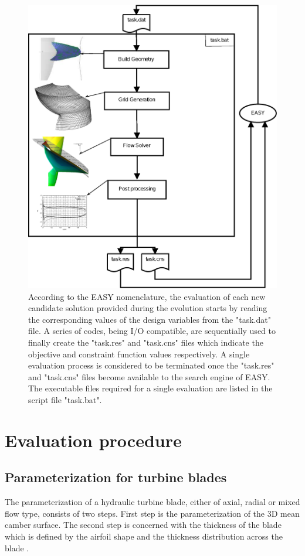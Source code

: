 \begin{figure}[h!]
\centering
\includegraphics[width=135mm]{Optimizationloop.eps} 
\caption{According to the EASY nomenclature, the evaluation of each new candidate solution provided during the evolution starts by reading the corresponding values of the design variables from the "task.dat" file. A series of codes, being I/O compatible, are sequentially used to finally create the "task.res" and "task.cns" files which indicate the objective and constraint function values respectively. A single evaluation process is considered to be terminated once the "task.res" and "task.cns" files  become available to the search engine of EASY. The executable files required for a single evaluation are listed in the script file "task.bat". }
\label{evaltool}
\end{figure}      
      
\section{Evaluation procedure}
\label{ParamEval}
\subsection{Parameterization for turbine blades}
\label{Paramt}
The  parameterization of a hydraulic turbine blade, either of axial, radial or mixed flow type, consists of two steps. First step is the parameterization of the 3D mean camber surface. The second step is concerned with the thickness of the blade which is defined by the airfoil shape and the thickness distribution across the blade \cite{dipl_livia,dipl_simon}.

